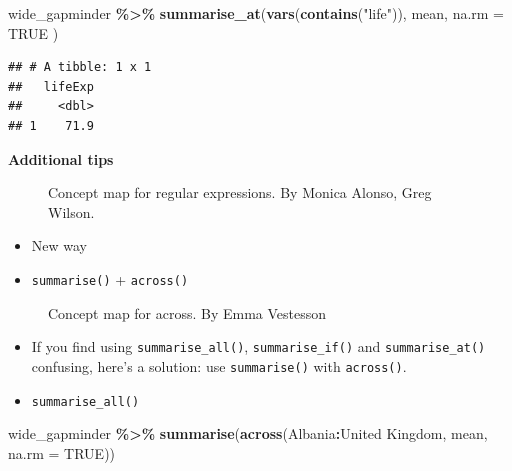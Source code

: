 \documentclass[
]{book}
\newenvironment{Shaded}{\begin{snugshade}}{\end{snugshade}}
\newcommand{\AttributeTok}[1]{\textcolor[rgb]{0.13,0.29,0.53}{#1}}
\newcommand{\ConstantTok}[1]{\textcolor[rgb]{0.56,0.35,0.01}{#1}}
\newcommand{\FunctionTok}[1]{\textcolor[rgb]{0.13,0.29,0.53}{\textbf{#1}}}
\newcommand{\NormalTok}[1]{#1}
\newcommand{\SpecialCharTok}[1]{\textcolor[rgb]{0.81,0.36,0.00}{\textbf{#1}}}
\newcommand{\StringTok}[1]{\textcolor[rgb]{0.31,0.60,0.02}{#1}}
\begin{document}
\begin{Shaded}
\begin{Highlighting}[]
\NormalTok{wide\_gapminder }\SpecialCharTok{\%\textgreater{}\%}
  \FunctionTok{summarise\_at}\NormalTok{(}\FunctionTok{vars}\NormalTok{(}\FunctionTok{contains}\NormalTok{(}\StringTok{"life"}\NormalTok{)),}
\NormalTok{    mean,}
    \AttributeTok{na.rm =} \ConstantTok{TRUE}
\NormalTok{  )}
\end{Highlighting}
\end{Shaded}

\begin{verbatim}
## # A tibble: 1 x 1
##   lifeExp
##     <dbl>
## 1    71.9
\end{verbatim}

\textbf{Additional tips}

\begin{figure}
\centering

\caption{Concept map for regular expressions. By Monica Alonso, Greg Wilson.}
\end{figure}

\begin{itemize}
\item
  New way
\item
  \texttt{summarise()} + \texttt{across()}
\end{itemize}

\begin{figure}
\centering

\caption{Concept map for across. By Emma Vestesson}
\end{figure}

\begin{itemize}
\item
  If you find using \texttt{summarise\_all()}, \texttt{summarise\_if()} and \texttt{summarise\_at()} confusing, here's a solution: use \texttt{summarise()} with \texttt{across()}.
\item
  \texttt{summarise\_all()}
\end{itemize}

\begin{Shaded}
\begin{Highlighting}[]
\NormalTok{wide\_gapminder }\SpecialCharTok{\%\textgreater{}\%}
  \FunctionTok{summarise}\NormalTok{(}\FunctionTok{across}\NormalTok{(Albania}\SpecialCharTok{:}\StringTok{\textasciigrave{}}\AttributeTok{United Kingdom}\StringTok{\textasciigrave{}}\NormalTok{, mean, }\AttributeTok{na.rm =} \ConstantTok{TRUE}\NormalTok{))}
\end{Highlighting}
\end{Shaded}
\end{document}
